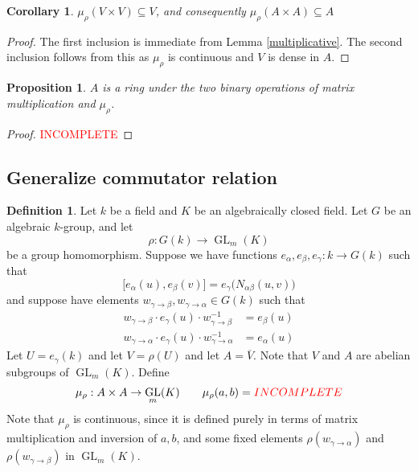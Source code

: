 \documentclass[12pt]{article}
\newtheorem{proposition}{Proposition}
\newtheorem{corollary}{Corollary}
\theoremstyle{definition}
\newtheorem{definition}{Definition}
\newcommand{\incomplete}{\textcolor{red}{INCOMPLETE}}
\newcommand{\inv}{^{-1}}
\newcommand{\ov}{\overline}
\DeclareMathOperator{\GL}{GL}
\begin{document}
\begin{corollary}
$\mu_\rho(V \times V) \subseteq V$, and consequently $\mu_\rho(A \times A) \subseteq A$
\end{corollary}
\begin{proof}
The first inclusion is immediate from Lemma \ref{multiplicative}. The second inclusion follows from this as $\mu_\rho$ is continuous and $V$ is dense in $A$.
\end{proof}

\begin{proposition}
$A$ is a ring under the two binary operations of matrix multiplication and $\mu_\rho$.
\end{proposition}
\begin{proof}
\incomplete
\end{proof}

\newpage

\subsection{Generalize commutator relation}

\begin{definition}
Let $k$ be a field and $K$ be an algebraically closed field. Let $G$ be an algebraic $k$-group, and let
\[
	\rho:G(k) \to \GL_m(K)
\]
be a group homomorphism. Suppose we have functions $e_\alpha, e_\beta, e_\gamma:k \to G(k)$ such that
\[
	\Big[ e_\alpha(u),  e_\beta(v) \Big] = e_\gamma \Big( N_{\alpha \beta}(u,v) \Big)
\]
and suppose have elements $w_{\gamma \to \beta}, w_{\gamma \to \alpha} \in G(k)$ such that
\begin{align*}
	w_{\gamma \to \beta} \cdot e_\gamma (u) \cdot w_{\gamma \to \beta} \inv &= e_\beta (u) \\
	w_{\gamma \to \alpha} \cdot e_\gamma (u) \cdot w_{\gamma \to \alpha} \inv &= e_\alpha (u)
\end{align*}
Let $U = e_\gamma (k)$ and let $V = \rho(U)$ and let $A = \ov{V}$. Note that $V$ and $A$ are abelian subgroups of $\GL_m(K)$. Define
\begin{align*}
	\mu_\rho:A \times A \to \GL_m(K) \qquad
	\mu_\rho(a,b) = \incomplete %
\end{align*}
Note that $\mu_{\rho}$ is continuous, since it is defined purely in terms of matrix multiplication and inversion of $a, b$, and some fixed elements $\rho(w_{\gamma \to \alpha})$ and $\rho(w_{\gamma \to \beta})$ in $\GL_m(K)$. 
\end{definition}
\end{document}

